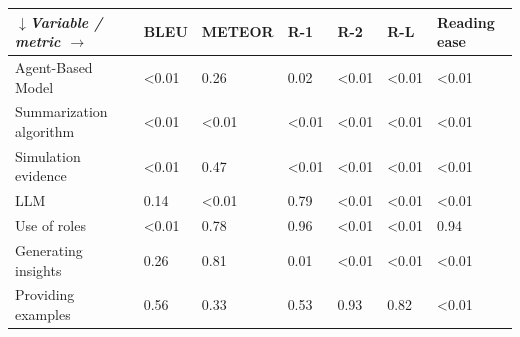 \begin{tabular}{|l|l|l|l|l|l|l|}
\hline
\textit{$\downarrow$Variable / metric $\rightarrow$} & BLEU & METEOR & R-1 & R-2 & R-L & Reading ease \\
 \hline
 Agent-Based Model & \textless{}0.01 & 0.26 & 0.02 & \textless{}0.01 & \textless{}0.01 & \textless{}0.01 \\
 \hline
 Summarization algorithm & \textless{}0.01 & \textless{}0.01 & \textless{}0.01 & \textless{}0.01 & \textless{}0.01 & \textless{}0.01 \\
 \hline
 Simulation evidence & \textless{}0.01 & 0.47 & \textless{}0.01 & \textless{}0.01 & \textless{}0.01 & \textless{}0.01 \\
 \hline
 LLM & 0.14 & \textless{}0.01 & 0.79 & \textless{}0.01 & \textless{}0.01 & \textless{}0.01 \\
 \hline
 Use of roles & \textless{}0.01 & 0.78 & 0.96 & \textless{}0.01 & \textless{}0.01 & 0.94 \\
 \hline
 Generating insights & 0.26 & 0.81 & 0.01 & \textless{}0.01 & \textless{}0.01 & \textless{}0.01 \\
 \hline
 Providing examples & 0.56 & 0.33 & 0.53 & 0.93 & 0.82 & \textless{}0.01 \\
\hline
\end{tabular}
